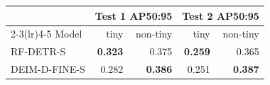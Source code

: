 \begin{tabular}{lrrrr}
\toprule
 & \multicolumn{2}{c}{Test 1 AP50:95} & \multicolumn{2}{c}{Test 2 AP50:95} \\
\cmidrule(lr){2-3}\cmidrule(lr){4-5}
Model & tiny & non-tiny & tiny & non-tiny \\
\midrule
RF-DETR-S & \textbf{0.323} & 0.375 & \textbf{0.259} & 0.365 \\
DEIM-D-FINE-S & 0.282 & \textbf{0.386} & 0.251 & \textbf{0.387} \\
\bottomrule
\end{tabular}
